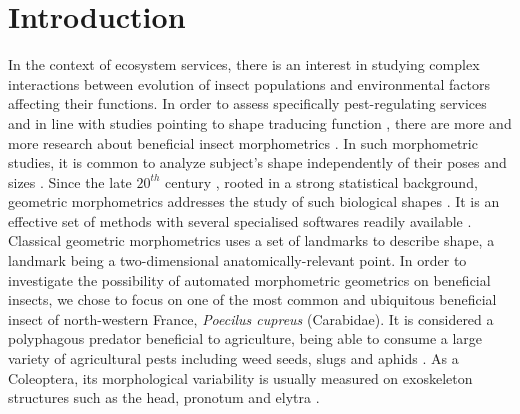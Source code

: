 \documentclass[review]{elsarticle}
\begin{document}
\linenumbers

\section{Introduction}

In the context of ecosystem services, there is an interest in studying complex interactions between evolution of insect populations and environmental factors affecting their functions. In order to assess specifically pest-regulating services and in line with studies pointing to shape traducing function \cite{klingenberg_evolution_2010}, there are more and more research about beneficial insect morphometrics \cite{sasakawa_utility_2016,raymond_combination_2014}. 
 In such morphometric studies, it is common to analyze subject's shape independently of their poses and sizes \cite{kendall_diffusion_1977}. Since the late $20^{th}$ century \cite{bookstein_foundations_1982}, rooted in a strong statistical background, geometric morphometrics addresses the study of such biological shapes \cite{rohlf_applications_1998}. It is an effective set of methods with several specialised softwares readily available \cite{adams_geomorph:_2013,klingenberg_morphoj:_2011}. Classical geometric morphometrics uses a set of landmarks to describe shape, a landmark being a two-dimensional anatomically-relevant point. In order to investigate the possibility of automated morphometric geometrics on beneficial insects, we chose to focus on one of the most common and ubiquitous beneficial insect of north-western France, \textit{Poecilus cupreus} (Carabidae). It is considered a polyphagous predator \cite{larochelle_1990} beneficial to agriculture, being able to consume a large variety of agricultural pests including weed seeds, slugs and aphids \cite{kromp_carabid_1999}. As a Coleoptera, its morphological variability is usually measured on exoskeleton structures such as the head, pronotum and elytra \cite{eldred_does_2016}. \\
 
\end{document}
